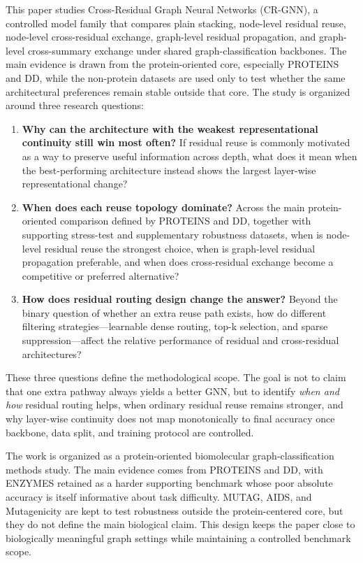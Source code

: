 This paper studies Cross-Residual Graph Neural Networks (CR-GNN), a controlled model family that compares plain stacking, node-level residual reuse, node-level cross-residual exchange, graph-level residual propagation, and graph-level cross-summary exchange under shared graph-classification backbones. The main evidence is drawn from the protein-oriented core, especially PROTEINS and DD, while the non-protein datasets are used only to test whether the same architectural preferences remain stable outside that core. The study is organized around three research questions:

\begin{enumerate}
    \item \textbf{Why can the architecture with the weakest representational continuity still win most often?} If residual reuse is commonly motivated as a way to preserve useful information across depth, what does it mean when the best-performing architecture instead shows the largest layer-wise representational change?
    \item \textbf{When does each reuse topology dominate?} Across the main protein-oriented comparison defined by PROTEINS and DD, together with supporting stress-test and supplementary robustness datasets, when is node-level residual reuse the strongest choice, when is graph-level residual propagation preferable, and when does cross-residual exchange become a competitive or preferred alternative?
    \item \textbf{How does residual routing design change the answer?} Beyond the binary question of whether an extra reuse path exists, how do different filtering strategies---learnable dense routing, top-k selection, and sparse suppression---affect the relative performance of residual and cross-residual architectures?
\end{enumerate}

These three questions define the methodological scope. The goal is not to claim that one extra pathway always yields a better GNN, but to identify \emph{when and how} residual routing helps, when ordinary residual reuse remains stronger, and why layer-wise continuity does not map monotonically to final accuracy once backbone, data split, and training protocol are controlled.

The work is organized as a protein-oriented biomolecular graph-classification methods study. The main evidence comes from PROTEINS and DD, with ENZYMES retained as a harder supporting benchmark whose poor absolute accuracy is itself informative about task difficulty. MUTAG, AIDS, and Mutagenicity are kept to test robustness outside the protein-centered core, but they do not define the main biological claim. This design keeps the paper close to biologically meaningful graph settings while maintaining a controlled benchmark scope.

